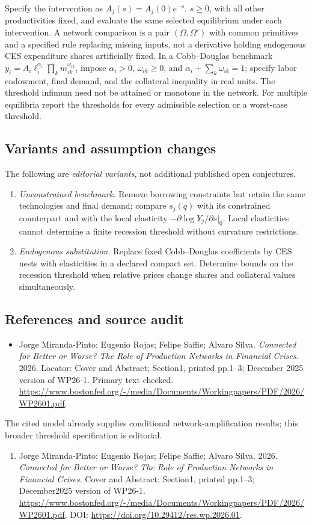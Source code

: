\documentclass[11pt,a4paper]{article}
\begin{document}
Specify the intervention as \(A_j(s)=A_j(0)e^{-s}\), \(s\ge0\), with all other productivities fixed, and evaluate the same selected equilibrium under each intervention. A network comparison is a pair \((\Omega,\Omega')\) with common primitives and a specified rule replacing missing inputs, not a derivative holding endogenous CES expenditure shares artificially fixed. In a Cobb--Douglas benchmark \(y_i=A_i\ell_i^{\alpha_i}\prod_k m_{ik}^{\omega_{ik}}\), impose \(\alpha_i>0\), \(\omega_{ik}\ge0\), and \(\alpha_i+\sum_k\omega_{ik}=1\); specify labor endowment, final demand, and the collateral inequality in real units. The threshold infimum need not be attained or monotone in the network. For multiple equilibria report the thresholds for every admissible selection or a worst-case threshold.
\subsection*{Variants and assumption changes}
The following are \emph{editorial variants}, not additional published open conjectures.
\begin{enumerate}
\item \emph{Unconstrained benchmark.} Remove borrowing constraints but retain the same technologies and final demand; compare \(s_j(q)\) with its constrained counterpart and with the local elasticity \(-\partial\log Y_j/\partial s|_{0}\). Local elasticities cannot determine a finite recession threshold without curvature restrictions.
\item \emph{Endogenous substitution.} Replace fixed Cobb--Douglas coefficients by CES nests with elasticities in a declared compact set. Determine bounds on the recession threshold when relative prices change shares and collateral values simultaneously.
\end{enumerate}
\subsection*{References and source audit}
\begin{itemize}
\item Jorge Miranda-Pinto; Eugenio Rojas; Felipe Saffie; Alvaro Silva. \emph{Connected for Better or Worse? The Role of Production Networks in Financial Crises}. 2026. Locator: Cover and Abstract; Section1, printed pp.1--3; December 2025 version of WP26-1. Primary text checked. \url{https://www.bostonfed.org/-/media/Documents/Workingpapers/PDF/2026/WP2601.pdf}.
\end{itemize}
The cited model already supplies conditional network-amplification results; this broader threshold specification is editorial.
\begin{enumerate}\raggedright
\item\hypertarget{definitions:source:30007513:1}{} Jorge Miranda-Pinto; Eugenio Rojas; Felipe Saffie; Alvaro Silva. 2026. \emph{Connected for Better or Worse? The Role of Production Networks in Financial Crises}. Cover and Abstract; Section1, printed pp.1--3; December2025 version of WP26-1.
\url{https://www.bostonfed.org/-/media/Documents/Workingpapers/PDF/2026/WP2601.pdf}.
DOI: \url{https://doi.org/10.29412/res.wp.2026.01}.
\end{enumerate}
\end{document}
